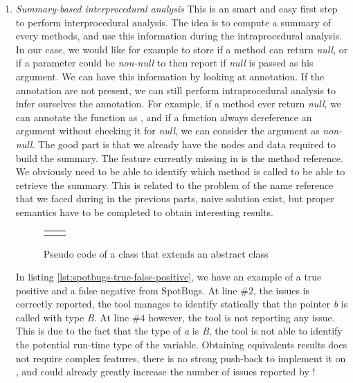 \begin{enumerate}
	\item \textit{Summary-based interprocedural analysis} \newline
	This is an smart and easy first step to perform interprocedural analysis.
	The idea is to compute a summary of every methods, and use this information during the intraprocedural analysis. 
	In our case, we would like for example to store if a method can return \emph{null}, or if a parameter could be \emph{non-null} to then report if \emph{null} is passed as his argument. 
	We can have this information by looking at annotation.
	If the annotation are not present, we can still perform intraprocedural analysis to infer ourselves the annotation. 
	For example, if a method ever return \emph{null}, we can annotate the function as \nullable{}, and if a function always dereference an argument without checking it for \emph{null}, we can consider the argument as \emph{non-null}. 
	The good part is that we already have the nodes and data required to build the summary. 
	The feature currently missing in \slang{} is the method reference. 
	We obviously need to be able to identify which method is called to be able to retrieve the summary.
	This is related to the problem of the name reference that we faced during in the previous parts, naive solution exist, but proper semantics have to be completed to obtain interesting results.


\begin{figure}[h]
	\centering
	\caption{Pseudo code of a class that extends an abstract class}
	\label{figure:class-extends-abtract}
	\setlength{\tabcolsep}{24pt}
	\begin{tabular}{cc}
		\multicolumn{1}{c}{} & \multicolumn{1}{c}{} \\
	\end{tabular}
\end{figure}
	
	
	
	In listing \ref{lst:spotbugs-true-false-positive}, we have an example of a true positive and a false negative from SpotBugs. At line $\#2$, the issues is correctly reported, the tool manages to identify statically that the pointer \emph{b} is called with type \emph{B}. At line $\#4$ however, the tool is not reporting any issue. This is due to the fact that the type of \emph{a} is \emph{B}, the tool is not able to identify the potential run-time type of the variable.\newline
	Obtaining equivalents results does not require complex features, there is no strong push-back to implement it on \slang{}, and could already greatly increase the number of issues reported by \slang{}!
\end{enumerate}
